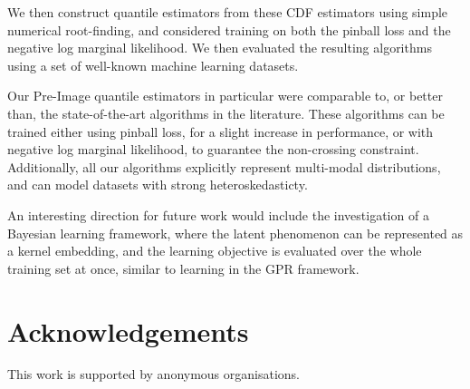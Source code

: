 \documentclass[twoside]{article} \usepackage{aistats2017}
\theoremstyle{definition}
\theoremstyle{theorem}
\begin{document}
	We then construct quantile estimators from these CDF estimators using simple numerical root-finding, and considered training on both the pinball loss and the negative log marginal likelihood. We then evaluated the resulting algorithms using a set of well-known machine learning datasets.
	
	Our Pre-Image quantile estimators in particular were comparable to, or better than, the state-of-the-art algorithms in the literature. These algorithms can be trained either using pinball loss, for a slight increase in performance, or with negative log marginal likelihood, to guarantee the non-crossing constraint. Additionally, all our algorithms explicitly represent multi-modal distributions, and can model datasets with strong heteroskedasticty.
	
	An interesting direction for future work would include the investigation of a Bayesian learning framework, where the latent phenomenon can be represented as a kernel embedding, and the learning objective is evaluated over the whole training set at once, similar to learning in the GPR framework.

\section*{Acknowledgements}

	This work is supported by anonymous organisations.


\end{document}
